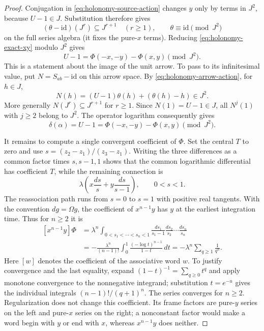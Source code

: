 \documentclass[11pt]{article}
\theoremstyle{definition}
\theoremstyle{remark}
\numberwithin{equation}{section}
\begin{document}
\begin{proof}
Conjugation in \eqref{eq:holonomy-source-action} changes $y$ only by
terms in $J^2$, because $U-1\in J$.  Substitution therefore gives
\[
 (\theta-\mathrm{id})(J^r)\subseteq J^{r+1}\quad(r\geq1),
 \qquad\theta\equiv\mathrm{id}\pmod{J^2}
\]
on the full series algebra (it fixes the pure-$x$ terms).
Reducing \eqref{eq:holonomy-exact-xy} modulo $J^2$ gives
\begin{equation}\label{eq:holonomy-unit-difference}
 U-1=\Phi(-x,-y)-\Phi(x,y)\pmod{J^2}.
\end{equation}
This is a statement about the image of the unit arrow.  To pass to its
infinitesimal value, put $N=S_{ab}-\mathrm{id}$ on this arrow space.  By
\eqref{eq:holonomy-arrow-action}, for $h\in J$,
\[
 N(h)=(U-1)\theta(h)+(\theta(h)-h)\in J^2.
\]
More generally $N(J^r)\subseteq J^{r+1}$ for $r\geq1$.
Since $N(1)=U-1\in J$, all $N^j(1)$ with $j\geq2$ belong to $J^2$.
The operator logarithm consequently gives
\begin{equation}\label{eq:holonomy-log-depth-one}
 \delta(\alpha)=U-1
 =\Phi(-x,-y)-\Phi(x,y)\pmod{J^2}.
\end{equation}

It remains to compute a single convergent coefficient of $\Phi$.
Set the central $T$ to zero and use
$s=(z_2-z_1)/(z_3-z_1)$.  Writing the three differences as a common
factor times $s,s-1,1$ shows that the common logarithmic differential
has coefficient $T$, while the remaining connection is
\begin{equation}\label{eq:holonomy-interval-connection}
 \lambda\left(x\frac{ds}{s}+y\frac{ds}{s-1}\right),
 \qquad 0<s<1.
\end{equation}
The reassociation path runs from $s=0$ to $s=1$ with positive real
tangents.  With the convention $dg=\Omega g$, the coefficient of
$x^{n-1}y$ has $y$ at the earliest integration time.  Thus for $n\geq2$
it is
\begin{equation}\label{eq:holonomy-zeta-integral}
\begin{split}
 [x^{n-1}y]\Phi
 &=\lambda^n
 \int_{0<s_1<\cdots<s_n<1}
 \frac{ds_1}{s_1-1}\frac{ds_2}{s_2}\cdots\frac{ds_n}{s_n}\\
 &=-\frac{\lambda^n}{(n-1)!}
 \int_0^1\frac{(-\log t)^{n-1}}{1-t}\,dt
 =-\lambda^n\sum_{q\geq1}\frac1{q^n}.
\end{split}
\end{equation}
Here $[w]$ denotes the coefficient of the associative word $w$.
To justify convergence and the last equality, expand
$(1-t)^{-1}=\sum_{q\geq0}t^q$ and apply monotone convergence to the
nonnegative integrand; substitution $t=e^{-u}$ gives the individual
integrals $(n-1)!/(q+1)^n$.  The series converges for $n\geq2$.
Regularization does not change this coefficient.  Its frame factors
are pure-$y$ series on the left and pure-$x$ series on the right; a
nonconstant factor would make a word begin with $y$ or end with $x$,
whereas $x^{n-1}y$ does neither.


\end{proof}
\end{document}
